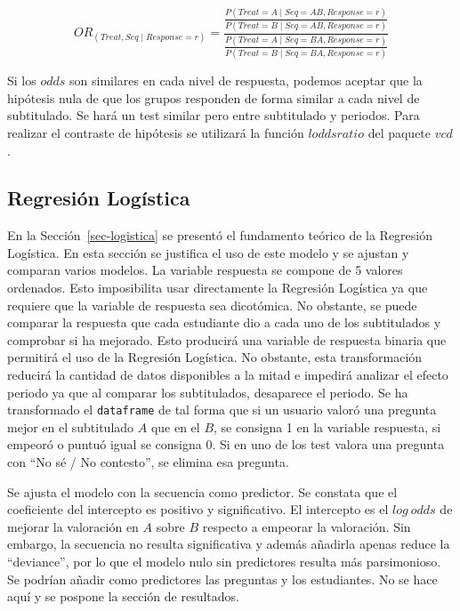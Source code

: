 \documentclass[
  12pt,
  a4paper,
  extrafontsizes,
  onecolumn,
  openright,
  table]{memoir}
\begin{document}
\[
OR_{(Treat, Seq \mid Response=r)}=\frac{
    \frac{
            P(Treat=A \mid Seq=AB, Response=r)
        }{
            P(Treat=B \mid Seq=AB, Response=r)
        }
    }
    {\frac{
        P(Treat=A \mid Seq=BA, Response=r)
        }{
        P(Treat=B \mid Seq=BA, Response=r)
    }
}
\]

Si los \(odds\) son similares en cada nivel de respuesta, podemos
aceptar que la hipótesis nula de que los grupos responden de forma
similar a cada nivel de subtitulado. Se hará un test similar pero entre
subtitulado y periodos. Para realizar el contraste de hipótesis se
utilizará la función \(loddsratio\) del paquete \(vcd\).

\hypertarget{sec-logistica-2}{%
\subsection{Regresión Logística}\label{sec-logistica-2}}

En la Sección~\ref{sec-logistica} se presentó el fundamento teórico de
la Regresión Logística. En esta sección se justifica el uso de este
modelo y se ajustan y comparan varios modelos. La variable respuesta se
compone de 5 valores ordenados. Esto imposibilita usar directamente la
Regresión Logística ya que requiere que la variable de respuesta sea
dicotómica. No obstante, se puede comparar la respuesta que cada
estudiante dio a cada uno de los subtitulados y comprobar si ha
mejorado. Esto producirá una variable de respuesta binaria que permitirá
el uso de la Regresión Logística. No obstante, esta transformación
reducirá la cantidad de datos disponibles a la mitad e impedirá analizar
el efecto periodo ya que al comparar los subtitulados, desaparece el
periodo. Se ha transformado el \texttt{dataframe} de tal forma que si un
usuario valoró una pregunta mejor en el subtitulado \(A\) que en el
\(B\), se consigna 1 en la variable respuesta, si empeoró o puntuó igual
se consigna 0. Si en uno de los test valora una pregunta con \enquote{No
sé / No contesto}, se elimina esa pregunta.

Se ajusta el modelo con la secuencia como predictor. Se constata que el
coeficiente del intercepto es positivo y significativo. El intercepto es
el \(log\ odds\) de mejorar la valoración en \(A\) sobre \(B\) respecto
a empeorar la valoración. Sin embargo, la secuencia no resulta
significativa y además añadirla apenas reduce la \enquote{deviance}, por
lo que el modelo nulo sin predictores resulta más parsimonioso. Se
podrían añadir como predictores las preguntas y los estudiantes. No se
hace aquí y se pospone la sección de resultados.
\end{document}
